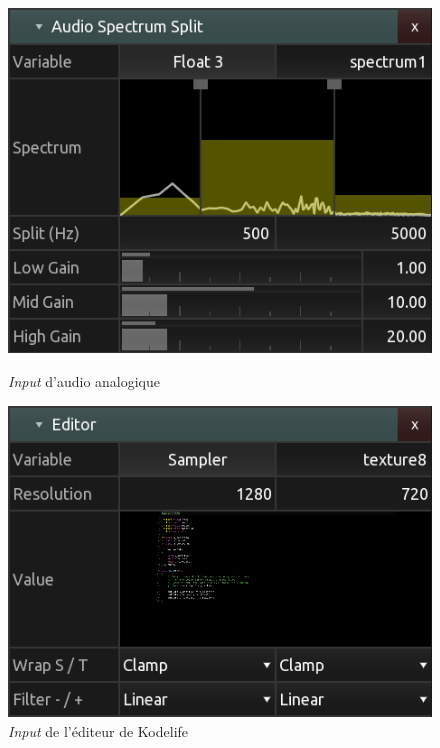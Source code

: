 \begin{figure}[h]
  \begin{minipage}[b]{0.45\linewidth}
    \centering
    \includegraphics[width=\linewidth]{images/experiments/kodelife02.png}
    \caption{\textit{Input} d'audio analogique}
    \label{kodelife02}
  \end{minipage}
  \hspace{0.1\linewidth} %
  \begin{minipage}[b]{0.45\linewidth}
    \centering
    \includegraphics[width=\linewidth]{images/experiments/kodelife03.png}
    \caption{\textit{Input} de l'éditeur de Kodelife}
    \label{kodelife03}
  \end{minipage}
\end{figure}


